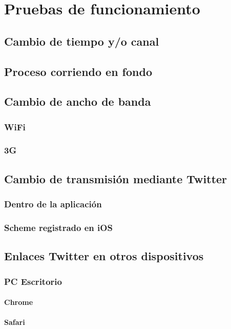 	
\chapter{Pruebas de funcionamiento}
\section{Cambio de tiempo y/o canal}
\section{Proceso corriendo en fondo} %
\section{Cambio de ancho de banda}
	\subsection{WiFi}
	\subsection{3G}
\section{Cambio de transmisión mediante Twitter}
	\subsection{Dentro de la aplicación}
	\subsection{Scheme registrado en iOS}
\section{Enlaces Twitter en otros dispositivos}
	\subsection{PC Escritorio}
		\subsubsection{Chrome}
		\subsubsection{Safari}
